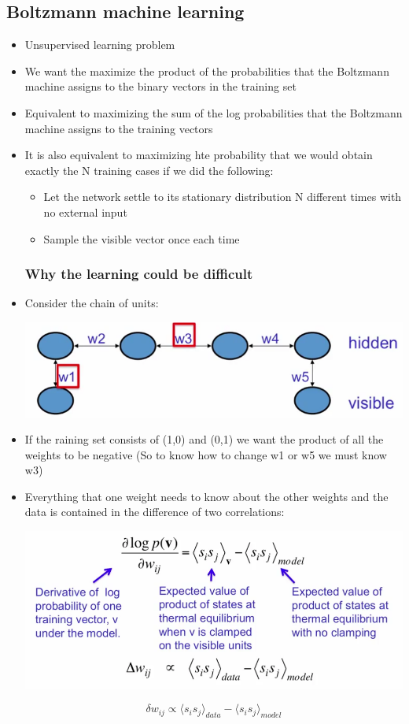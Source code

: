 \subsection{Boltzmann machine learning}
\begin{itemize}
	\item Unsupervised learning problem
	\item We want the maximize the product of the probabilities that the Boltzmann machine assigns to the binary vectors in the training set
	\item Equivalent to maximizing the sum of the log probabilities that the Boltzmann machine assigns to the training vectors
	\item It is also equivalent to maximizing hte probability that we would obtain exactly the N training cases if we did the following:
	\begin{itemize}
		\item Let the network settle to its stationary distribution N different times with no external input
		\item Sample the visible vector once each time
	\end{itemize}

	\subsubsection{Why the learning could be difficult}
	\item Consider the chain of units:
	\begin{center}
		\includegraphics[scale=0.6]{sections/12/chain.png}
	\end{center}
	\item If the raining set consists of (1,0) and (0,1) we want the product of all the weights to be negative (So to know how to change w1 or w5 we must know w3)

	\item Everything that one weight needs to know about the other weights and the data is contained in the difference of two correlations:
	\begin{center}
		\includegraphics[scale=0.6]{sections/12/corr.png}
	\end{center}
		$$\delta w_{ij} \propto \langle s_i s_j \rangle_{data} - \langle s_i s_j \rangle_{model}$$


\end{itemize}
